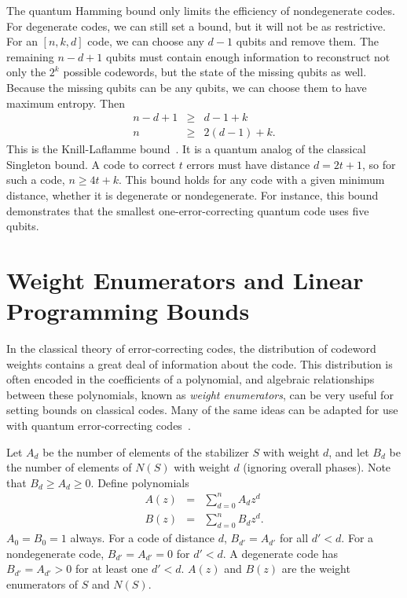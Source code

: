 \documentclass{report}
\newcommand{\Sum}{\sum}
\begin{document}
The quantum Hamming bound only limits the efficiency of nondegenerate 
codes.  For degenerate codes, we can still set a bound, but it will not be as 
restrictive.  For an $[n, k, d]$ code, we can choose any $d-1$ qubits and 
remove them.  The remaining $n-d+1$ qubits must contain enough 
information to reconstruct not only the $2^k$ possible codewords, but the state 
of the missing qubits as well.  Because the missing qubits can be any 
qubits, we can choose them to have maximum entropy.  Then
\begin{eqnarray}
n-d+1 & \geq & d-1+k \\
n & \geq & 2(d-1) + k.
\end{eqnarray}
This is the Knill-Laflamme bound~\cite{knill-laflamme-theory,cerf-cleve}. 
It is a quantum analog of the classical Singleton bound. 
A code to correct $t$ errors must have distance $d=2t+1$, so for such a 
code, $n \geq 4t + k$.  This bound holds for any code with a given 
minimum distance, whether it is degenerate or nondegenerate.  For 
instance, this bound demonstrates that the smallest one-error-correcting 
quantum code uses five qubits.

\section{Weight Enumerators and Linear Programming Bounds}
\label{sec-enumerators}

In the classical theory of error-correcting codes, the distribution of 
codeword weights contains a great deal of information about the code.  
This distribution is often encoded in the coefficients of a polynomial, and 
algebraic relationships between these polynomials, known as {\em weight 
enumerators}, can be very useful for setting bounds on classical codes.  
Many of the same ideas can be adapted for use with quantum 
error-correcting codes~\cite{rains-shadow, shor-laflamme-QMW, 
rains-enumerators, rains-poly-invariants}.

Let $A_d$ be the number of elements of the stabilizer $S$ with weight $d$, 
and let $B_d$ be the number of elements of $N(S)$ with weight $d$ (ignoring
overall phases).  Note that $B_d \geq A_d \geq 0$.  Define polynomials
\begin{eqnarray}
A (z) & = & \Sum_{d=0}^{n} A_d z^d \\
B (z) & = & \Sum_{d=0}^{n} B_d z^d.
\end{eqnarray}
$A_0 = B_0 = 1$ always.  For a code of distance $d$, $B_{d'} = A_{d'}$ for 
all $d' < d$.  For a nondegenerate code, $B_{d'} = A_{d'} = 0$ for $d' < d$.  A 
degenerate code has $B_{d'} = A_{d'} > 0$ for at least one $d' < d$.  $A(z)$ 
and $B(z)$ are the weight enumerators of $S$ and $N(S)$.
\end{document}
